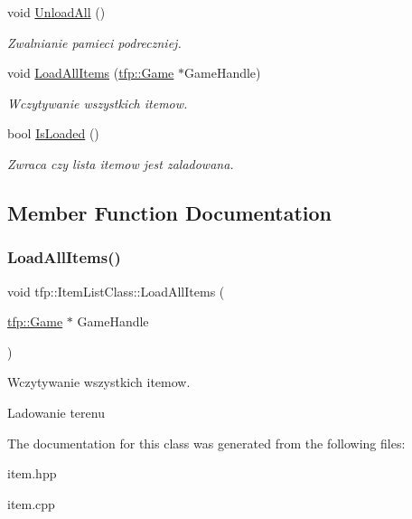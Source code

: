 \begin{DoxyCompactItemize}
\mbox{\label{classtfp_1_1_item_list_class_a8c720938a5d7c00a2ff772a49984a43f}} 
void \mbox{\hyperlink{classtfp_1_1_item_list_class_a8c720938a5d7c00a2ff772a49984a43f}{Unload\+All}} ()
\begin{DoxyCompactList}\small\item\em Zwalnianie pamieci podreczniej. \end{DoxyCompactList}\item 
void \mbox{\hyperlink{classtfp_1_1_item_list_class_a0062d76c65cdec3e6631ccc69cd4c367}{Load\+All\+Items}} (\mbox{\hyperlink{classtfp_1_1_game}{tfp\+::\+Game}} $\ast$Game\+Handle)
\begin{DoxyCompactList}\small\item\em Wczytywanie wszystkich itemow. \end{DoxyCompactList}\item 
\mbox{\label{classtfp_1_1_item_list_class_a7970343727fd2c6230300471fb5badce}} 
bool \mbox{\hyperlink{classtfp_1_1_item_list_class_a7970343727fd2c6230300471fb5badce}{Is\+Loaded}} ()
\begin{DoxyCompactList}\small\item\em Zwraca czy lista itemow jest zaladowana. \end{DoxyCompactList}\end{DoxyCompactItemize}


\subsection{Member Function Documentation}
\mbox{\label{classtfp_1_1_item_list_class_a0062d76c65cdec3e6631ccc69cd4c367}} 
\subsubsection{\texorpdfstring{Load\+All\+Items()}{LoadAllItems()}}
{\footnotesize\ttfamily void tfp\+::\+Item\+List\+Class\+::\+Load\+All\+Items (\begin{DoxyParamCaption}\item[{\mbox{\hyperlink{classtfp_1_1_game}{tfp\+::\+Game}} $\ast$}]{Game\+Handle }\end{DoxyParamCaption})}



Wczytywanie wszystkich itemow. 

Ladowanie terenu 

The documentation for this class was generated from the following files\+:\begin{DoxyCompactItemize}
\item 
item.\+hpp\item 
item.\+cpp\end{DoxyCompactItemize}
